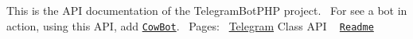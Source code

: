 This is the A\+P\+I documentation of the Telegram\+Bot\+P\+H\+P project.~\newline
 For see a bot in action, using this A\+P\+I, add \href{https://telegram.me/cowmooobot}{\tt Cow\+Bot}.~\newline
 Pages\+:~\newline
 \hyperlink{class_telegram}{Telegram} Class A\+P\+I ~\newline
 \href{md__r_e_a_d_m_e.html}{\tt Readme} 